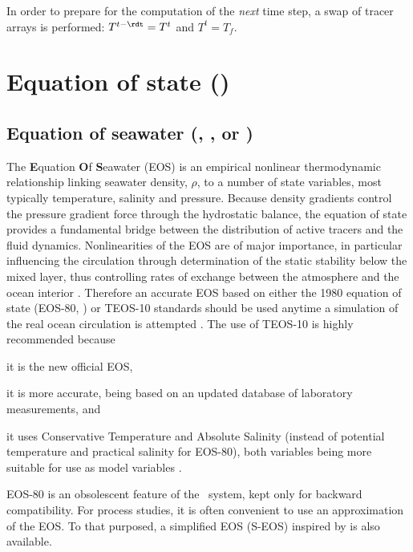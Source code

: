 \documentclass[../main/NEMO_manual]{subfiles}
\begin{document}
In order to prepare for the computation of the \textit{next} time step,
a swap of tracer arrays is performed: $T^{t - \rdt} = T^t$ and $T^t = T_f$.

\section[Equation of state (\textit{eosbn2.F90})]{Equation of state (\protect{})}
\label{sec:TRA_eosbn2}

\begin{listing}
  \caption{}
  \label{lst:nameos}
\end{listing}

\subsection[Equation of seawater (\forcode{ln_}\{\forcode{teos10,eos80,seos}\})]{Equation of seawater (\protect{}, \protect{}, or \protect{})}
\label{subsec:TRA_eos}

The \textbf{E}quation \textbf{O}f \textbf{S}eawater (EOS) is
an empirical nonlinear thermodynamic relationship linking
seawater density, $\rho$, to a number of state variables,
most typically temperature, salinity and pressure.
Because density gradients control the pressure gradient force through the hydrostatic balance,
the equation of state provides a fundamental bridge between
the distribution of active tracers and the fluid dynamics.
Nonlinearities of the EOS are of major importance, in particular influencing the circulation through
determination of the static stability below the mixed layer,
thus controlling rates of exchange between the atmosphere and the ocean interior
\citep{roquet.madec.ea_JPO15}.
Therefore an accurate EOS based on either the 1980 equation of state
(EOS-80, \cite{fofonoff.millard_bk83}) or TEOS-10 \citep{ioc.iapso_bk10} standards should
be used anytime a simulation of the real ocean circulation is attempted \citep{roquet.madec.ea_JPO15}.
The use of TEOS-10 is highly recommended because
\begin{enumerate*}[label=(\textit{\roman*})]
\item it is the new official EOS,
\item it is more accurate, being based on an updated database of laboratory measurements, and
\item it uses Conservative Temperature and Absolute Salinity
  (instead of potential temperature and practical salinity for EOS-80),
  both variables being more suitable for use as model variables
  \citep{ioc.iapso_bk10, graham.mcdougall_JPO13}.
\end{enumerate*}
EOS-80 is an obsolescent feature of the \NEMO\ system, kept only for backward compatibility.
For process studies, it is often convenient to use an approximation of the EOS.
To that purposed, a simplified EOS (S-EOS) inspired by \citet{vallis_bk06} is also available.
\end{document}
